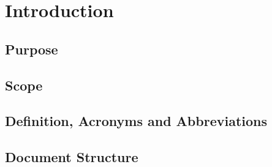 \section{Introduction}

\subsection{Purpose}

\subsection{Scope}

\subsection{Definition, Acronyms and Abbreviations}

\subsection{Document Structure}

